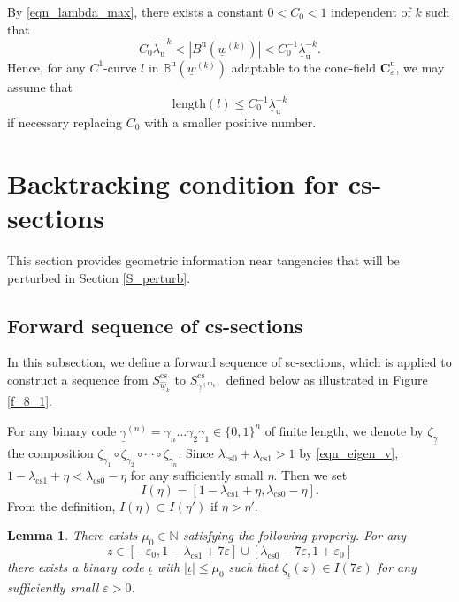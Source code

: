 \documentclass{amsart}
\newtheorem{lem}[thm]{Lemma}
\theoremstyle{definition}
\numberwithin{equation}{section}
\numberwithin{figure}{section}
\begin{document}
By \eqref{eqn_lambda_max}, there exists a constant $0<C_0<1$ independent of $k$ such that 
\begin{equation}\label{eqn_C0GC0}
C_0\bar{\lambda}_{\mathrm{u}}^{-k}<|B^{\mathrm{u}}(\underline{w}^{(k)})|<C_0^{-1}\underline{\lambda}_{\mathrm{u}}^{-k}. 
\end{equation}
Hence, for any $C^1$-curve $l$ in $\mathbb{B}^{\mathrm{u}}(\underline{w}^{(k)})$ adaptable to the cone-field $\boldsymbol{C}_{\varepsilon}^{\mathrm{u}}$, 
we may assume that 
\begin{equation}\label{eqn_lC0lam}
\mathrm{length}(l)\leq C_0^{-1}\underline{\lambda}_{\mathrm{u}}^{-k}
\end{equation} if necessary replacing $C_0$ with a smaller positive number.





\section{Backtracking condition for cs-sections}\label{S_BTC}


This section provides geometric information near tangencies that will be perturbed in
Section \ref{S_perturb}.


\subsection{Forward sequence of cs-sections}\label{ss_forward}

In this subsection, we define a forward sequence of sc-sections, which is applied   
to construct a sequence from $S_{\widehat{\underline{w}}_k}^{\mathrm{cs}}$ to 
$S_{\underline{\gamma}^{(m_k)}}^{\mathrm{cs}}$ defined below as illustrated in Figure \ref{f_8_1}.



For any binary code $\underline{\gamma}^{(n)}=\gamma_n\dots \gamma_2\gamma_1\in \{0,1\}^n$ of finite length, we denote by 
$\zeta_{\underline\gamma}$ the composition $\zeta_{\gamma_1}\circ\zeta_{\gamma_2}\circ\cdots\circ 
\zeta_{\gamma_n}$.
Since $\lambda_{\mathrm{cs} 0}+\lambda_{\mathrm{cs} 1}>1$ by \eqref{eqn_eigen_v}, 
$1-\lambda_{\mathrm{cs} 1}+\eta<\lambda_{\mathrm{cs} 0}-\eta$ for any sufficiently small $\eta$.
Then we set 
$$I(\eta)=[1-\lambda_{\mathrm{cs} 1}+\eta,\lambda_{\mathrm{cs} 0}-\eta].$$
From the definition, $I(\eta)\subset I(\eta')$ if $\eta>\eta'$.




\begin{lem}\label{l_zeta_zeta}
There exists $\mu_0\in\mathbb{N}$ satisfying the following property.
For any 
$$z\in [-\varepsilon_0,1-\lambda_{\mathrm{cs} 1}+7\varepsilon]\cup[\lambda_{\mathrm{cs} 0}-7\varepsilon,1+\varepsilon_0]$$
there exists a binary code $\underline\iota$ with $|\underline\iota|\leq \mu_0$ such that 
$\zeta_{\underline\iota}(z)\in I(7\varepsilon)$ for any sufficiently small $\varepsilon>0$.
\end{lem}
\end{document}
